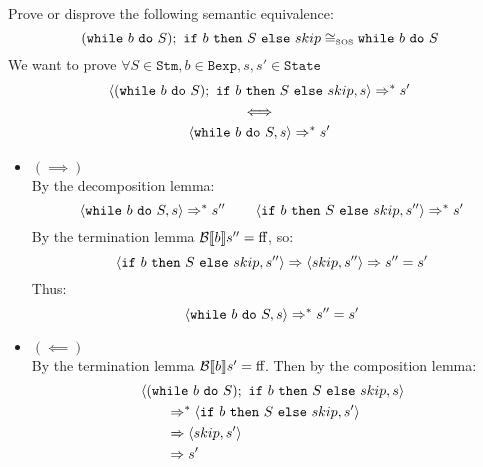 \begin{exercise}{
    Prove or disprove the following semantic equivalence:
    \[ (\texttt{while}\ b\ \texttt{do}\ S);\ \texttt{if}\ b\ \texttt{then}\ S\ \texttt{else}\ skip \cong_{\text{\tiny SOS}} \texttt{while}\ b\ \texttt{do}\ S \]\vspace*{-0.6cm}
}
    We want to prove $\forall S \in \texttt{Stm}, b \in \texttt{Bexp}, s, s' \in \texttt{State}$
    \begin{gather*}
        \left<(\texttt{while}\ b\ \texttt{do}\ S);\ \texttt{if}\ b\ \texttt{then}\ S\ \texttt{else}\ skip, s\right> \Rightarrow^* s' \\
        \iff \\
        \left<\texttt{while}\ b\ \texttt{do}\ S, s\right> \Rightarrow^* s'
    \end{gather*}
    \begin{itemize}
        \item $(\implies)$ \vspace{0.2cm} \\
            By the decomposition lemma:\vspace*{-0.3cm}
            \[ \left<\texttt{while}\ b\ \texttt{do}\ S, s\right> \Rightarrow^* s'' \qquad \left<\texttt{if}\ b\ \texttt{then}\ S\ \texttt{else}\ skip, s''\right> \Rightarrow^* s' \]
            By the termination lemma $\mathcal{B} \llbracket b \rrbracket s'' = \text{ff}$, so:\vspace*{-0.3cm}
            \[ \left<\texttt{if}\ b\ \texttt{then}\ S\ \texttt{else}\ skip, s''\right> \Rightarrow \left<skip, s''\right> \Rightarrow s'' = s' \]
            Thus:
            \[ \left<\texttt{while}\ b\ \texttt{do}\ S, s\right> \Rightarrow^* s'' = s' \]
        \item $(\impliedby)$ \vspace{0.2cm} \\
            By the termination lemma $\mathcal{B} \llbracket b \rrbracket s' = \text{ff}$. Then by the composition lemma:\vspace*{-0.3cm}
            \begin{align*}
                &\left<(\texttt{while}\ b\ \texttt{do}\ S);\ \texttt{if}\ b\ \texttt{then}\ S\ \texttt{else}\ skip, s\right>
                \\&\qquad \Rightarrow^* \left<\texttt{if}\ b\ \texttt{then}\ S\ \texttt{else}\ skip, s'\right>
                \\&\qquad \Rightarrow \left<skip, s'\right>
                \\&\qquad \Rightarrow s'
            \end{align*}
    \end{itemize}
\end{exercise}
